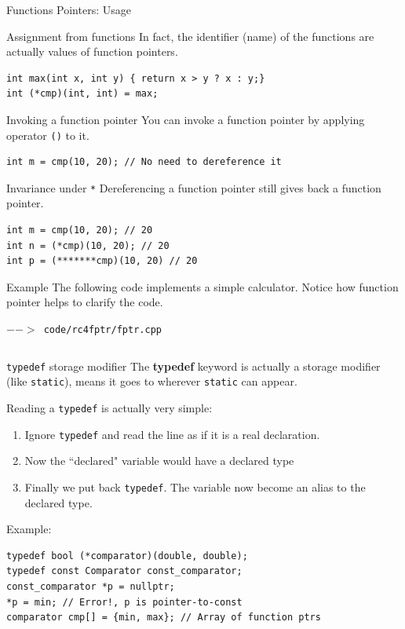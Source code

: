 \begin{frame}[fragile]{Functions Pointers: Usage}
\begin{block}{Assignment from functions}
	In fact, the identifier (name) of the functions are actually values of function pointers. 
\begin{verbatim}
int max(int x, int y) { return x > y ? x : y;}
int (*cmp)(int, int) = max;
\end{verbatim}
\end{block}
\vspace{-0.1in}
\begin{block}{Invoking a function pointer}
	You can invoke a function pointer by applying operator \texttt{()} to it.
\begin{verbatim}
int m = cmp(10, 20); // No need to dereference it
\end{verbatim}
\end{block}
\vspace{-0.1in}
\begin{block}{Invariance under \texttt{*}}
	Dereferencing a function pointer still gives back a function pointer.
\begin{verbatim}
int m = cmp(10, 20); // 20
int n = (*cmp)(10, 20); // 20
int p = (*******cmp)(10, 20) // 20
\end{verbatim}
\end{block}
\end{frame}

\begin{frame}[fragile]{Example}
The following code implements a simple calculator. Notice how function pointer helps to clarify the code.

\texttt{$-->$ code/rc4fptr/fptr.cpp}
\inputminted{c++}{code/rc4fptr/fptr.cpp}
\end{frame}


\begin{frame}[fragile]{\texttt{typedef} storage modifier}
The \textbf{typedef} keyword is actually a storage modifier (like \texttt{static}), means it goes to wherever \texttt{static} can appear. 

Reading a \texttt{typedef} is actually very simple:
\begin{enumerate}
	\item Ignore \texttt{typedef} and read the line as if it is a real declaration.
	\item Now the ``declared" variable would have a declared type
	\item Finally we put back \texttt{typedef}. The variable now become an alias to the declared type.
\end{enumerate}
Example:
\begin{verbatim}
typedef bool (*comparator)(double, double);
typedef const Comparator const_comparator;
const_comparator *p = nullptr;
*p = min; // Error!, p is pointer-to-const
comparator cmp[] = {min, max}; // Array of function ptrs
\end{verbatim}
\end{frame}


